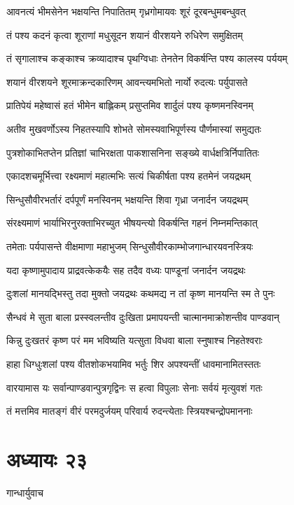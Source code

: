 \twolineshloka
{आवनत्यं भीमसेनेन भक्षयन्ति निपातितम्}
{गृध्रगोमायवः शूरं दूरबन्धुमबन्धुवत्}


\twolineshloka
{तं पश्य कदनं कृत्वा शूराणां मधुसूदन}
{शयानं वीरशयने रुधिरेण समुक्षितम्}


\twolineshloka
{तं सृगालाश्च कङ्काश्च क्रव्यादाश्च पृथग्विधाः}
{तेनतेन विकर्षन्ति पश्य कालस्य पर्ययम्}


\twolineshloka
{शयानं वीरशयने शूरमाक्रन्दकारिणम्}
{आवन्त्यमभितो नार्यो रुदत्यः पर्युपासते}


\twolineshloka
{प्रातिपेयं महेष्वासं हतं भीमेन बाह्लिकम्}
{प्रसुप्तमिव शार्दुलं पश्य कृष्णमनस्विनम्}


\twolineshloka
{अतीव मुखवर्णोऽस्य निहतस्यापि शोभते}
{सोमस्यवाभिपूर्णस्य पौर्णमास्यां समुद्यतः}


\twolineshloka
{पुत्रशोकाभितप्तेन प्रतिज्ञां चाभिरक्षता}
{पाकशासनिना सङ्ख्ये वार्धक्षत्रिर्निपातितः}


\twolineshloka
{एकादशचमूर्भित्त्वा रक्ष्यमाणं महात्मभिः}
{सत्यं चिकीर्षता पश्य हतमेनं जयद्रथम्}


\twolineshloka
{सिन्धुसौवीरभर्तारं दर्पपूर्णं मनस्विनम्}
{भक्षयन्ति शिवा गृध्रा जनार्दन जयद्रथम्}


\twolineshloka
{संरक्ष्यमाणं भार्याभिरनुरक्ताभिरच्युत}
{भीषयन्त्यो विकर्षन्ति गहनं निम्नमन्तिकात्}


\twolineshloka
{तमेताः पर्यपासन्ते वीक्षमाणा महाभुजम्}
{सिन्धुसौवीरकाम्भोजगान्धारयवनस्त्रियः}


\twolineshloka
{यदा कृष्णामुपादाय प्राद्रवत्केकयैः सह}
{तदैव वध्यः पाण्डूनां जनार्दन जयद्रथः}


\twolineshloka
{दुःशलां मानयद्भिस्तु तदा मुक्तो जयद्रथः}
{कथमद्य न तां कृष्ण मानयन्ति स्म ते पुनः}


\twolineshloka
{सैन्धवं मे सुता बाला प्रस्स्वलन्तीव दुःखिता}
{प्रमापयन्ती चात्मानमाक्रोशन्तीव पाण्डवान्}


\twolineshloka
{किन्नु दुःखतरं कृष्ण परं मम भविष्यति}
{यत्सुता विधवा बाला स्नुषाश्च निहतेश्वराः}


\twolineshloka
{हाहा धिग्धुःशलां पश्य वीतशोकभयामिव}
{भर्तुः शिर अपश्यन्तीं धावमानामितस्ततः}


\twolineshloka
{वारयामास यः सर्वान्पाण्डवान्पुत्रगृद्विनः}
{स हत्वा विपुलाः सेनाः सर्वयं मृत्युवशं गतः}


\twolineshloka
{तं मत्तमिव मातङ्गं वीरं परमदुर्जयम्}
{परिवार्य रुदन्त्येताः स्त्रियश्चन्द्रोपमाननाः}


\chapter{अध्यायः २३}
\twolineshloka
{गान्धार्युवाच}
{}


